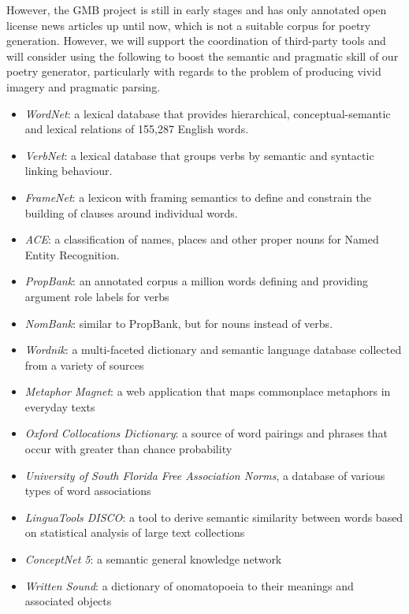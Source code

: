 However, the GMB project is still in early stages and has only annotated open license news articles up until now, which is not a suitable corpus for poetry generation. However, we will support the coordination of third-party tools and will consider using the following to boost the semantic and pragmatic skill of our poetry generator, particularly with regards to the problem of producing vivid imagery and pragmatic parsing.
\begin{itemize}
\item{\textit{WordNet}: a lexical database that provides hierarchical, conceptual-semantic and lexical relations of 155,287 English words.\cite{miller1995wordnet}}
\item{\textit{VerbNet}: a lexical database that groups verbs by semantic and syntactic linking behaviour.\cite{schuler2005verbnet}}
\item{\textit{FrameNet}: a lexicon with framing semantics to define and constrain the building of clauses around individual words.\cite{baker1998berkeley}}
\item{\textit{ACE}: a classification of names, places and other proper nouns for Named Entity Recognition.\cite{doddington2004automatic}}
\item{\textit{PropBank}: an annotated corpus a million words defining and providing argument role labels for verbs\cite{kingsbury2002treebank}}
\item{\textit{NomBank}: similar to PropBank, but for nouns instead of verbs.\cite{meyers2004nombank}}
\item{\textit{Wordnik}: a multi-faceted dictionary and semantic language database collected from a variety of sources\cite{wordnik}}
\item{\textit{Metaphor Magnet}: a web application that maps commonplace metaphors in everyday texts\cite{vealespecifying}}
\item{\textit{Oxford Collocations Dictionary}: a source of word pairings and phrases that occur with greater than chance probability\cite{crowther2003oxford}}
\item{\textit{University of South Florida Free Association Norms}, a database of various types of word associations\cite{nelson2004university}}
\item{\textit{LinguaTools DISCO}: a tool to derive semantic similarity between words based on statistical analysis of large text collections\cite{kolb2008disco}}
\item{\textit{ConceptNet 5}: a semantic general knowledge network\cite{liu2004conceptnet}}
\item{\textit{Written Sound}: a dictionary of onomatopoeia to their meanings and associated objects\cite{onomat}}
\end{itemize}


